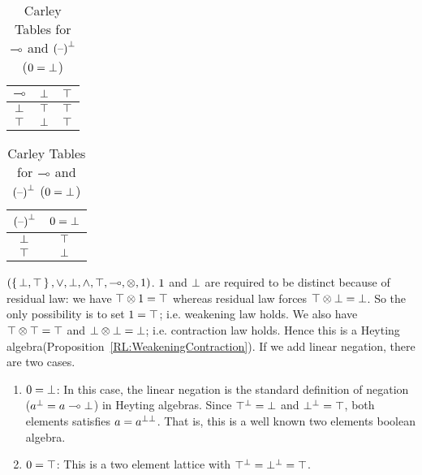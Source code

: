 \begin{table}[hbt]
\begin{center}
  \begin{tabular}{c|cc}
  $\multimap$ & $\bot$ &  $\top$  \\ \hline
  $\bot$  & $\top$ &  $\top$ \\
  $\top$  & $\bot$ &  $\top$ \\
  \end{tabular}
\hskip 18pt
  \begin{tabular}{c|c}
  ${{{(\mbox{\textendash})}}^{\bot}}$ 
      & $\mbox{\boldmath{0}} = \bot$   \\ \hline
  $\bot$  & $\top$ \\
  $\top$  & $\bot$  \\
  \end{tabular}
  \caption{Carley Tables for $\multimap$ and ${{{(\mbox{\textendash})}}^{\bot}}$ ($\mbox{\boldmath{0}} = \bot$)}
  \end{center}
\end{table}

\begin{example} 
$(\set{\bot,\top},\vee,\bot,\wedge,\top,\multimap,\otimes,\mbox{\boldmath{1}})$.
$\mbox{\boldmath{1}}$ and $\bot$ are required to be distinct because of residual law: 
we have $\top \otimes \mbox{\boldmath{1}} = \top$  whereas residual law forces 
$\top \otimes \bot = \bot$. 
So the only possibility is to set $\mbox{\boldmath{1}} = \top$;  i.e. weakening law holds.
We also have $\top \otimes \top = \top$ and $\bot \otimes \bot = \bot$;
i.e. contraction law holds. 
Hence this is a Heyting algebra(Proposition~\ref{RL:WeakeningContraction}).
If we add linear negation, there are two cases. 
\begin{enumerate}
\item {\em $\mbox{\boldmath{0}} = \bot$}: In this case, the linear negation is the standard definition 
of negation (${{a}^{\bot}} = a \multimap \bot$) in Heyting algebras. 
Since  ${{\top}^{\bot}} = \bot$ and ${{\bot}^{\bot}} = \top$, 
both elements satisfies $a = {{a}^{\bot\bot}}$. 
That is, this is a well known two elements boolean algebra. 
\item {\em $\mbox{\boldmath{0}} = \top$}: 
This is a two element lattice with ${{\top}^{\bot}} = {{\bot}^{\bot}} = \top$.
\end{enumerate}
\end{example}


